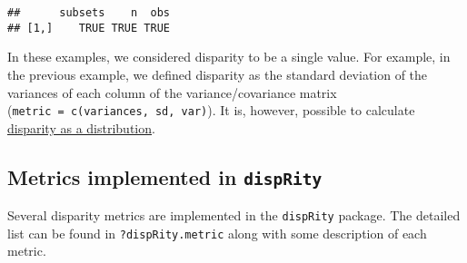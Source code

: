 \documentclass[
]{book}
\begin{document}
\begin{verbatim}
##      subsets    n  obs
## [1,]    TRUE TRUE TRUE
\end{verbatim}

In these examples, we considered disparity to be a single value.
For example, in the previous example, we defined disparity as the standard deviation of the variances of each column of the variance/covariance matrix (\texttt{metric\ =\ c(variances,\ sd,\ var)}).
It is, however, possible to calculate \protect\hyperlink{disparity-as-a-distribution}{disparity as a distribution}.

\hypertarget{metrics-implemented-in-disprity}{%
\subsection{\texorpdfstring{Metrics implemented in \texttt{dispRity}}{Metrics implemented in dispRity}}\label{metrics-implemented-in-disprity}}

Several disparity metrics are implemented in the \texttt{dispRity} package.
The detailed list can be found in \texttt{?dispRity.metric} along with some description of each metric.
\end{document}
